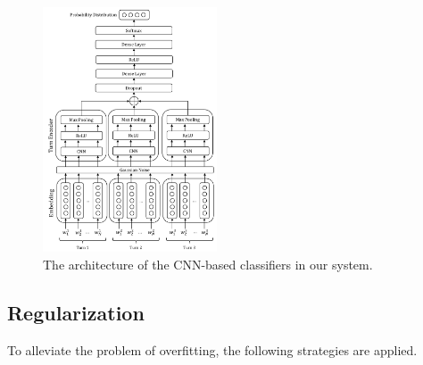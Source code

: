 \documentclass[11pt,a4paper]{article}
\begin{document}
\begin{figure}
\begin{center}
\includegraphics[width=0.46\textwidth]{framework_vertical.pdf}
\caption{\label{fig:classifier} The architecture of the CNN-based classifiers in our system.}
\end{center}
\end{figure}

\subsection{Regularization}

To alleviate the problem of overfitting, the following strategies are applied.
\end{document}
